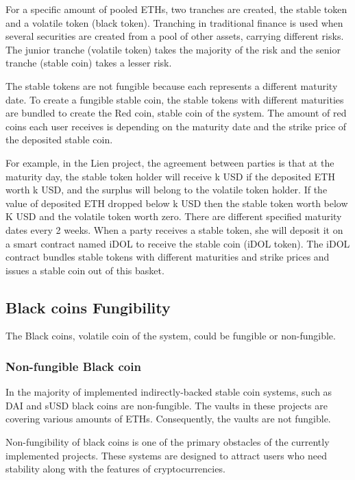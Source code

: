 For a specific amount of pooled ETHs, two tranches are created, the stable token and a volatile token (black token). Tranching in traditional finance is used when several securities are created from a pool of other assets, carrying different risks. The junior tranche (volatile token) takes the majority of the risk and the senior tranche (stable coin) takes a lesser risk.  

The stable tokens are not fungible because each represents a different maturity date.  To create a fungible stable coin, the stable tokens with different maturities are bundled to create the Red coin, stable coin of the system. The amount of red coins each user receives is depending on the maturity date and the strike price of the deposited stable coin.

For example, in the Lien project, the agreement between parties is that at the maturity day, the stable token holder will receive k USD if the deposited ETH worth k USD, and the surplus will belong to the volatile token holder. If the value of deposited ETH dropped below k USD then the stable token worth below K USD and the volatile token worth zero. There are different specified maturity dates every 2 weeks. When a party receives a stable token, she will deposit it on a smart contract named iDOL to receive the stable coin (iDOL token). The iDOL contract bundles stable tokens with different maturities and strike prices and issues a stable coin out of this basket.


\subsection{Black coins Fungibility}

The Black coins, volatile coin of the system, could be fungible or non-fungible. 

\subsubsection{Non-fungible Black coin}

In the majority of implemented indirectly-backed stable coin systems, such as DAI and sUSD black coins are non-fungible. The vaults in these projects are covering various amounts of ETHs. Consequently, the vaults are not fungible. 

Non-fungibility of black coins is one of the primary obstacles of the currently implemented projects. These systems are designed to attract users who need stability along with the features of cryptocurrencies. 

